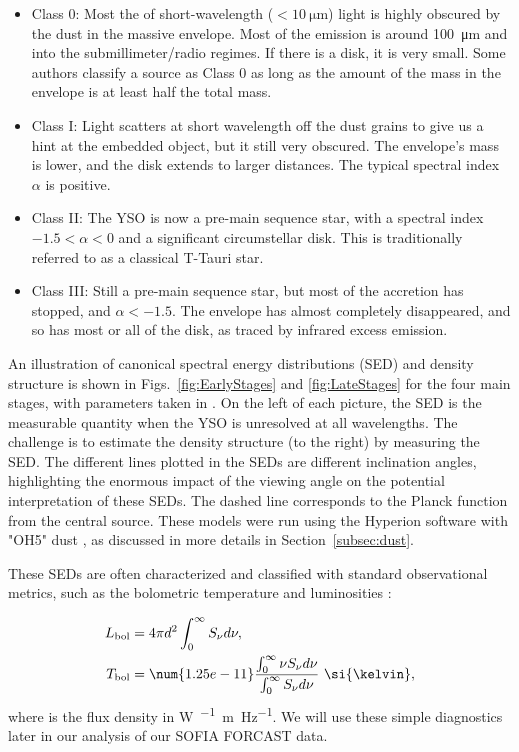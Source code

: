 \begin{itemize}
\item Class 0: Most the of short-wavelength ($<\SI{10}{\micro\meter}$) light is highly obscured by the dust in the massive envelope. Most of the emission is around \SI{100}{\micro\meter} and into the submillimeter/radio regimes. If there is a disk, it is very small. Some authors \citep{Dunham:2010bx} classify a source as Class 0 as long as the amount of the mass in the envelope is at least half the total mass.
\item Class I: Light scatters at short wavelength off the dust grains to give us a hint at the embedded object, but it still very obscured. The envelope's mass is lower, and the disk extends to larger distances. The typical spectral index $\alpha$ is positive.
\item Class II: The YSO is now a pre-main sequence star, with a spectral index $-1.5 < \alpha < 0$ and a significant circumstellar disk. This is traditionally referred to as a classical T-Tauri star.
\item Class III: Still a pre-main sequence star, but most of the accretion has stopped, and $\alpha < -1.5$. The envelope has almost completely disappeared, and so has most or all of the disk, as traced by infrared excess emission.
\end{itemize}

An illustration of canonical spectral energy distributions (SED) and density structure is shown in Figs.~\ref{fig:EarlyStages} and \ref{fig:LateStages} for the four main stages, with parameters taken in \citet{Whitney:2003kc}. On the left of each picture, the SED is the measurable quantity when the YSO is unresolved at all wavelengths. The challenge is to estimate the density structure (to the right) by measuring the SED. The different lines plotted in the SEDs are different inclination angles, highlighting the enormous impact of the viewing angle on the potential interpretation of these SEDs. The dashed line corresponds to the Planck function from the central source. These models were run using the Hyperion software \citep{Robitaille:2011fc} with "OH5" dust \citep{Ossenkopf:1994tq}, as discussed in more details in Section~\ref{subsec:dust}.

These SEDs are often characterized and classified with standard observational metrics, such as the bolometric temperature and luminosities \citep{Myers:1993en,Dunham:2010bx}:

\begin{align}
\Lbol &= 4\pi d^2\int_0^\infty\Snu d\nu,\\
\Tbol &= \num{1.25e-11} \frac{\int_0^\infty \nu\Snu d\nu}{\int_0^\infty \Snu d\nu}~\si{\kelvin},
\end{align}
%
where \Snu is the flux density in \si{\watt\per{}\meter\per\hertz}. We will use these simple diagnostics later in our analysis of our SOFIA FORCAST data.

